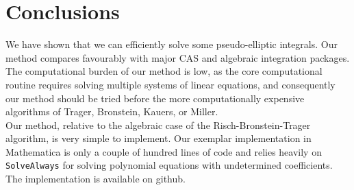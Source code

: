 \documentclass[12pt]{article}
\numberwithin{equation}{section}
\theoremstyle{definition}
\begin{document}
\section{Conclusions}

We have shown that we can efficiently solve some pseudo-elliptic integrals. Our method compares 
favourably with major CAS and algebraic integration packages.  \\

The computational burden of our method is low, as the core computational routine requires 
solving multiple systems of linear equations, and consequently our method should be tried before the 
more computationally expensive algorithms of Trager\cite{Trager1984}, Bronstein\cite{Bronstein1990}, 
Kauers\cite{Kauers2008}, or Miller\cite{Miller2012}.\\

Our method, relative to the algebraic case of the Risch-Bronstein-Trager algorithm, is very simple to 
implement. Our exemplar implementation in Mathematica is only a couple of hundred lines of code and 
relies heavily on \texttt{SolveAlways} for solving polynomial equations with undetermined coefficients. 
The implementation is available on github\cite{algebraic_github}. 


\end{document}
